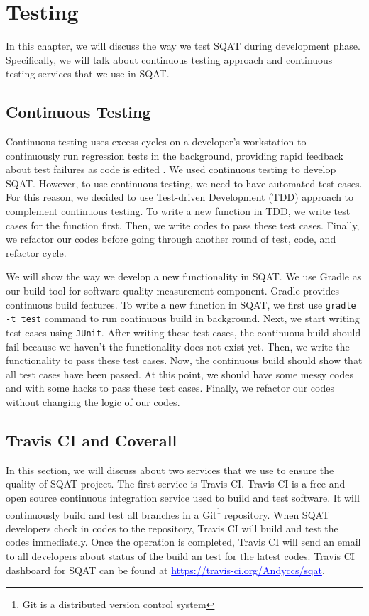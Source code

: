 \chapter{Testing}

In this chapter, we will discuss the way we test SQAT during development phase. Specifically, we will talk about continuous testing approach and continuous testing services that we use in SQAT.

\section{Continuous Testing}

Continuous testing uses excess cycles on a developer's workstation to continuously run regression tests in the background, providing rapid feedback about test failures as code is edited \cite[]{saff2005continuous}. We used continuous testing to develop SQAT. However, to use continuous testing, we need to have automated test cases. For this reason, we decided  to use Test-driven Development (TDD) approach to complement continuous testing. To write a new function in TDD, we write test cases for the function first. Then, we write codes to pass these test cases. Finally, we refactor our codes before going through another round of test, code, and refactor cycle. 

We will show the way we develop a new functionality in SQAT. We use Gradle as our build tool for software quality measurement component. Gradle provides continuous build features. To write a new function in SQAT, we first use \verb|gradle -t test| command to run continuous build in background. Next, we start writing test cases using \verb|JUnit|. After writing these test cases, the continuous build should fail because we haven't the functionality does not exist yet. Then, we write the functionality to pass these test cases. Now, the continuous build should show that all test cases have been passed. At this point, we should have some messy codes and with some hacks to pass these test cases. Finally, we refactor our codes without changing the logic of our codes. 

\section{Travis CI and Coverall}

In this section, we will discuss about two services that we use to ensure the quality of SQAT project. The first service is Travis CI. Travis CI is a free and open source continuous integration service used to build and test software. It will continuously build and test all branches in a Git\footnote{Git is a distributed version control system} repository. When SQAT developers check in codes to the repository, Travis CI will build and test the codes immediately. Once the operation is completed, Travis CI will send an email to all developers about status of the build an test for the latest codes. Travis CI dashboard for SQAT can be found at \textcolor{blue}{\underline{https://travis-ci.org/Andyccs/sqat}}.

